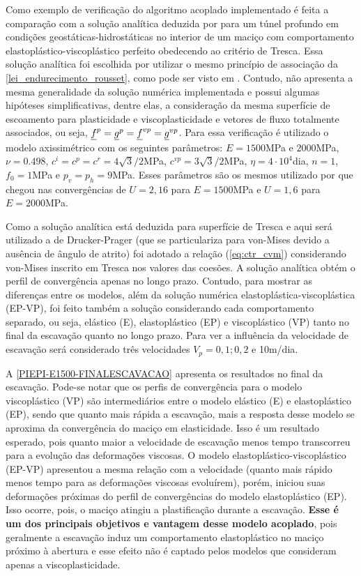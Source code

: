 Como exemplo de verificação do algoritmo acoplado implementado é feita a comparação com a solução analítica deduzida por  para um túnel profundo em condições geostáticas-hidrostáticas no interior de um maciço com comportamento elastoplástico-viscoplástico perfeito obedecendo ao critério de Tresca. Essa solução analítica foi escolhida por utilizar o mesmo princípio de associação da \autoref{lei_endurecimento_rousset}, como pode ser visto em . Contudo, não apresenta a mesma generalidade da solução numérica implementada e possui algumas hipóteses simplificativas, dentre elas, a consideração da mesma superfície de escoamento para plasticidade e viscoplasticidade e vetores de fluxo totalmente associados, ou seja, $\underline f^p = \underline{g}^{p} = \underline f^{vp} = \underline{g}^{vp}$. Para essa verificação é utilizado o modelo axissimétrico com os seguintes parâmetros: $E=1500$MPa e $2000$MPa, $\nu=0.498$, $c^i=c^p=c^r =4\sqrt{3}/2$MPa, $c^{vp}=3\sqrt{3}/2$MPa, $\eta = 4 \cdot 10^4$dia, $n=1$, $f_0=1$MPa e $p_v=p_h=9$MPa. Esses parâmetros são os mesmos utilizado por  que chegou nas convergências de $U=2,16$ para $E=1500$MPa e $U=1,6$ para $E=2000$MPa.

Como a solução analítica está deduzida para superfície de Tresca e aqui será utilizado a de Drucker-Prager (que se particulariza para von-Mises devido a ausência de ângulo de atrito) foi adotado a relação (\ref{eq:ctr_cvm}) considerando von-Mises inscrito em Tresca nos valores das coesões. A solução analítica obtém o perfil de convergência apenas no longo prazo. Contudo, para mostrar as diferenças entre os modelos, além da solução numérica elastoplástica-viscoplástica (EP-VP), foi feito também a solução considerando cada comportamento separado, ou seja, elástico (E), elastoplástico (EP) e viscoplástico (VP) tanto no final da escavação quanto no longo prazo. Para ver a influência da velocidade de escavação será considerado três velocidades $V_p=0,1; 0,2$ e 10m/dia.

A \autoref{PIEPI-E1500-FINALESCAVACAO} apresenta os resultados no final da escavação. Pode-se notar que os perfis de convergência para o modelo viscoplástico (VP) são intermediários entre o modelo elástico (E) e elastoplástico (EP), sendo que quanto mais rápida a escavação, mais a resposta desse modelo se  aproxima da convergência do maciço em elasticidade. Isso é um resultado esperado, pois quanto maior a velocidade de escavação menos tempo transcorreu para a evolução das deformações viscosas. O modelo elastoplástico-viscoplástico (EP-VP) apresentou a mesma relação com a velocidade (quanto mais rápido menos tempo para as deformações viscosas evoluírem), porém, iniciou suas deformações próximas do perfil de convergências do modelo elastoplástico (EP). Isso ocorre, pois, o maciço atingiu a plastificação durante a escavação. \textbf{Esse é um dos principais objetivos e vantagem desse modelo acoplado}, pois geralmente a escavação induz um comportamento elastoplástico no maciço próximo à abertura e esse efeito não é captado pelos modelos que consideram apenas a viscoplasticidade.

